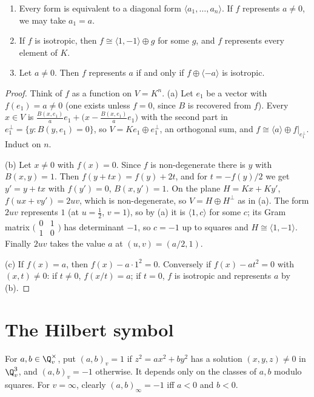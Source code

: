 \begin{proposition}\label{prop:diag}
\begin{enumerate}[label=(\alph*)]
\item Every form is equivalent to a diagonal form $\langle a_1,\dots,a_n\rangle$. If $f$ represents $a\ne0$, we may take
$a_1=a$.
\item If $f$ is isotropic, then $f\cong\langle1,-1\rangle\oplus g$ for some $g$, and $f$ represents every element of $K$.
\item Let $a\ne0$. Then $f$ represents $a$ if and only if $f\oplus\langle-a\rangle$ is isotropic.
\end{enumerate}
\end{proposition}
\begin{proof}
Think of $f$ as a function on $V=K^n$. (a) Let $e_1$ be a vector with $f(e_1)=a\ne0$ (one exists unless $f=0$, since $B$ is
recovered from $f$). Every $x\in V$ is $\frac{B(x,e_1)}a e_1+\bigl(x-\frac{B(x,e_1)}ae_1\bigr)$ with the second part in
$e_1^\perp=\{y:B(y,e_1)=0\}$, so $V=Ke_1\oplus e_1^\perp$, an orthogonal sum, and $f\cong\langle a\rangle\oplus f|_{e_1^\perp}$.
Induct on $n$.

(b) Let $x\ne0$ with $f(x)=0$. Since $f$ is non-degenerate there is $y$ with $B(x,y)=1$. Then $f(y+tx)=f(y)+2t$, and for
$t=-f(y)/2$ we get $y'=y+tx$ with $f(y')=0$, $B(x,y')=1$. On the plane $H=Kx+Ky'$, $f(ux+vy')=2uv$, which is non-degenerate, so
$V=H\oplus H^\perp$ as in (a). The form $2uv$ represents $1$ (at $u=\frac12$, $v=1$), so by (a) it is $\langle1,c\rangle$ for
some $c$; its Gram matrix $\bigl(\begin{smallmatrix}0&1\\1&0\end{smallmatrix}\bigr)$ has determinant $-1$, so $c=-1$ up to
squares and $H\cong\langle1,-1\rangle$. Finally $2uv$ takes the value $a$ at $(u,v)=(a/2,1)$.

(c) If $f(x)=a$, then $f(x)-a\cdot1^2=0$. Conversely if $f(x)-at^2=0$ with $(x,t)\ne0$: if $t\ne0$, $f(x/t)=a$; if $t=0$, $f$ is
isotropic and represents $a$ by (b).
\end{proof}

\section{The Hilbert symbol}

For $a,b\in\Q_v^\times$, put $(a,b)_v=1$ if $z^2=ax^2+by^2$ has a solution $(x,y,z)\ne0$ in $\Q_v^3$, and $(a,b)_v=-1$ otherwise.
It depends only on the classes of $a,b$ modulo squares. For $v=\infty$, clearly $(a,b)_\infty=-1$ iff $a<0$ and $b<0$.

